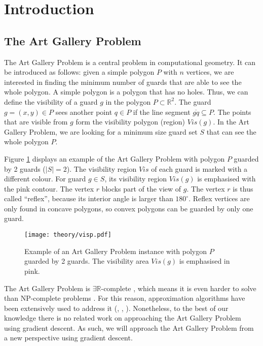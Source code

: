 \section{Introduction}
\subsection{The Art Gallery Problem}

The Art Gallery Problem \cite{o1987art} is a central problem in computational geometry. It can be introduced as follows: given a simple polygon $P$ with $n$ vertices, we are interested in finding the minimum number of guards that are able to see the whole polygon. A simple polygon is a polygon that has no holes. Thus, we can define the visibility of a guard $g$ in the polygon $P \subset \mathbb R^2$. The guard $g = (x, y) \in P$ sees another point $q \in P$ if the line segment $\overline{gq} \subseteq P$. The points that are visible from $g$ form the visibility polygon (region) $\mathit{Vis}(g)$. In the Art Gallery Problem, we are looking for a minimum size guard set $S$ that can see the whole polygon $P$.

Figure \ref{fig:art} displays an example of the Art Gallery Problem with polygon $P$ guarded by 2 guards ($|S| = 2$). The visibility region $\mathit{Vis}$ of each guard is marked with a different colour. For guard $g \in S$, its visibility region $\mathit{Vis}(g)$ is emphasised with the pink contour. The vertex $r$ blocks part of the view of $g$. The vertex $r$ is thus called ``reflex'', because its interior angle is larger than $180^\circ$. Reflex vertices are only found in concave polygons, so convex polygons can be guarded by only one guard.

\begin{figure}[h!]
    \centering
    \texttt{[image: theory/visp.pdf]}
    \caption{Example of an Art Gallery Problem instance with polygon $P$ guarded by 2 guards. The visibility area $\mathit{Vis}(g)$ is emphasised in pink.}
    \label{fig:art}
\end{figure}

The Art Gallery Problem is $\exists \mathbb R$-complete \cite{abrahamsen2021art}, which means it is even harder to solve than NP-complete problems \cite{schaefer2009complexity}. For this reason, approximation algorithms have been extensively used to address it (\cite{DBLP:journals/corr/BonnetM16b}, \cite{GHOSH2010718}, \cite{DBLP:journals/corr/abs-2007-06920}). Nonetheless, to the best of our knowledge there is no related work on approaching the Art Gallery Problem using gradient descent. As such, we will approach the Art Gallery Problem from a new perspective using gradient descent.


